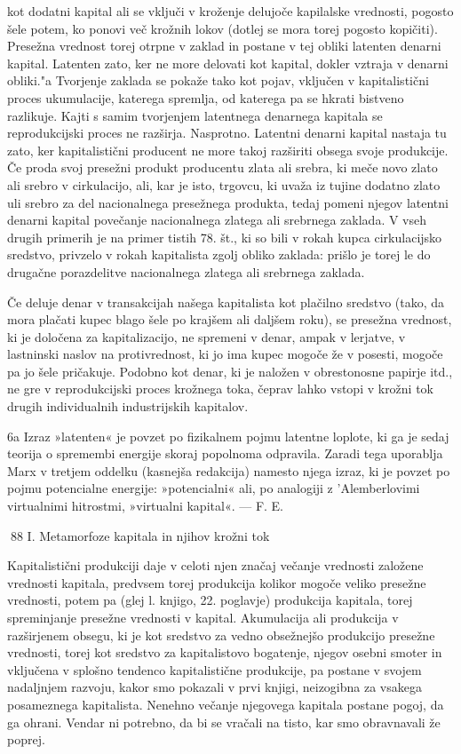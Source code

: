 \documentclass[kapital_02.tex]{subfiles}
\begin{document}
 kot dodatni kapital ali se vključi v kroženje delujoče kapilalske vrednosti, pogosto šele potem, ko ponovi več krožnih lokov (dotlej se mora torej pogosto kopičiti). Presežna vrednost torej otrpne v zaklad in postane v tej obliki latenten denarni kapital. Latenten zato, ker ne more delovati kot kapital, dokler vztraja v denarni obliki."a Tvorjenje zaklada se pokaže tako kot pojav, vključen v kapitalistični proces ukumulacije, katerega spremlja, od katerega pa se hkrati bistveno razlikuje. Kajti s samim tvorjenjem latentnega denarnega kapitala se reprodukcijski proces ne razširja. Nasprotno. Latentni denarni kapital nastaja tu zato, ker kapitalistični producent ne more takoj razširiti obsega svoje produkcije. Če proda svoj presežni produkt producentu zlata ali srebra, ki meče novo zlato ali srebro v cirkulacijo, ali, kar je isto, trgovcu, ki uvaža iz tujine dodatno zlato uli srebro za del nacionalnega presežnega produkta, tedaj pomeni njegov latentni denarni kapital povečanje nacionalnega zlatega ali srebrnega zaklada. V vseh drugih primerih je na primer tistih 78. št., ki so bili v rokah kupca cirkulacijsko sredstvo, privzelo v rokah kapitalista zgolj obliko zaklada: prišlo je torej le do drugačne porazdelitve nacionalnega zlatega ali srebrnega zaklada.

Če deluje denar v transakcijah našega kapitalista kot plačilno sredstvo (tako, da mora plačati kupec blago šele po krajšem ali daljšem roku), se presežna vrednost, ki je določena za kapitalizacijo, ne spremeni v denar, ampak v lerjatve, v lastninski naslov na protivrednost, ki jo ima kupec mogoče že v posesti, mogoče pa jo šele pričakuje. Podobno kot denar, ki je naložen v obrestonosne papirje itd., ne gre v reprodukcijski proces krožnega toka, čeprav lahko vstopi v krožni tok drugih individualnih industrijskih kapitalov.



 6a Izraz »latenten« je povzet po fizikalnem pojmu latentne loplote, ki ga je sedaj teorija o spremembi energije skoraj popolnoma odpravila. Zaradi tega uporablja Marx v tretjem oddelku (kasnejša redakcija) namesto njega izraz, ki je povzet po pojmu potencialne energije: »potencialni« ali, po analogiji z \KPED'Alemberlovimi virtualnimi hitrostmi, »virtualni kapital«. — F. E.



88 I. Metamorfoze kapitala in njihov krožni tok



 Kapitalistični produkciji daje v celoti njen značaj večanje vrednosti založene vrednosti kapitala, predvsem torej produkcija kolikor mogoče veliko presežne vrednosti, potem pa (glej l. knjigo, 22. poglavje) produkcija kapitala, torej spreminjanje presežne vrednosti v kapital. Akumulacija ali produkcija v razširjenem obsegu, ki je kot sredstvo za vedno obsežnejšo produkcijo presežne vrednosti, torej kot sredstvo za kapitalistovo bogatenje, njegov osebni smoter in vključena v splošno tendenco kapitalistične produkcije, pa postane v svojem nadaljnjem razvoju, kakor smo pokazali v prvi knjigi, neizogibna za vsakega posameznega kapitalista. Nenehno večanje njegovega kapitala postane pogoj, da ga ohrani. Vendar ni potrebno, da bi se vračali na tisto, kar smo obravnavali že poprej.
\end{document}
